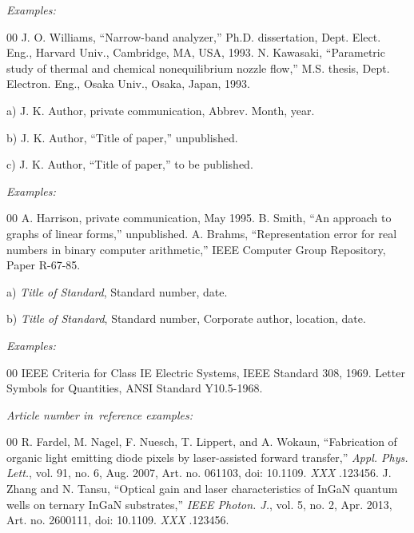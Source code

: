 \documentclass{ieeetj}
\begin{document}
{\it Examples:}

\begin{thebibliography}{00}
 J. O. Williams, ``Narrow-band analyzer,'' Ph.D. dissertation, Dept. Elect. Eng., Harvard Univ., Cambridge, MA, USA, 1993.
 N. Kawasaki, ``Parametric study of thermal and chemical nonequilibrium nozzle flow,'' M.S. thesis, Dept. Electron. Eng., Osaka Univ., Osaka, Japan, 1993.
\end{thebibliography}


\noindent a) J. K. Author, private communication, Abbrev. Month, year.

\noindent b) J. K. Author, ``Title of paper,'' unpublished.

\noindent c) J. K. Author, ``Title of paper,'' to be published.

{\it Examples:}

\begin{thebibliography}{00}
 A. Harrison, private communication, May 1995.
 B. Smith, ``An approach to graphs of linear forms,'' unpublished.
 A. Brahms, ``Representation error for real numbers in binary computer arithmetic,'' IEEE Computer Group Repository, Paper R-67-85.
\end{thebibliography}


\noindent a) {\it Title of Standard}, Standard number, date.

\noindent b) {\it Title of Standard}, Standard number, Corporate author, location, date.

{\it Examples:}

\begin{thebibliography}{00}
 IEEE Criteria for Class IE Electric Systems, IEEE Standard 308, 1969.
 Letter Symbols for Quantities, ANSI Standard Y10.5-1968.
\end{thebibliography}

{\it Article number in~reference examples:}

\begin{thebibliography}{00}
 R. Fardel, M. Nagel, F. Nuesch, T. Lippert, and A. Wokaun, ``Fabrication of organic light emitting diode pixels by laser-assisted forward transfer,'' {\it Appl. Phys. Lett.}, vol. 91, no. 6, Aug. 2007, Art. no. 061103, doi:  {10.1109.} {{\it XXX}} {.123456}.
 J. Zhang and N. Tansu, ``Optical gain and laser characteristics of InGaN quantum wells on ternary InGaN substrates,'' {\it IEEE Photon. J.}, vol. 5, no. 2, Apr. 2013, Art. no. 2600111, doi:  {10.1109.} {{\it XXX}} {.123456}.
\end{thebibliography}
\end{document}
